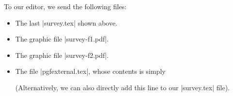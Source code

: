 To our editor, we send the following files:
\begin{itemize}
\item The last |survey.tex| shown above.
\item The graphic file |survey-f1.pdf|.
\item The graphic file |survey-f2.pdf|.
\item The file |pgfexternal.tex|, whose contents is simply
\begin{codeexample}
\long{}
\end{codeexample}
  (Alternatively, we can also directly add this line to our
  |survey.tex| file).
\end{itemize}

